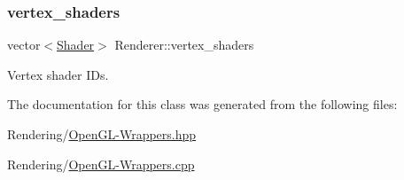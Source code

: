 \subsubsection{\texorpdfstring{vertex\+\_\+shaders}{vertex\_shaders}}
{\footnotesize\ttfamily vector$<$\mbox{\hyperlink{classShader}{Shader}}$>$ Renderer\+::vertex\+\_\+shaders\hspace{0.3cm}{\ttfamily [private]}}



Vertex shader I\+Ds. 



The documentation for this class was generated from the following files\+:\begin{DoxyCompactItemize}
\item 
Rendering/\mbox{\hyperlink{OpenGL-Wrappers_8hpp}{Open\+G\+L-\/\+Wrappers.\+hpp}}\item 
Rendering/\mbox{\hyperlink{OpenGL-Wrappers_8cpp}{Open\+G\+L-\/\+Wrappers.\+cpp}}\end{DoxyCompactItemize}

